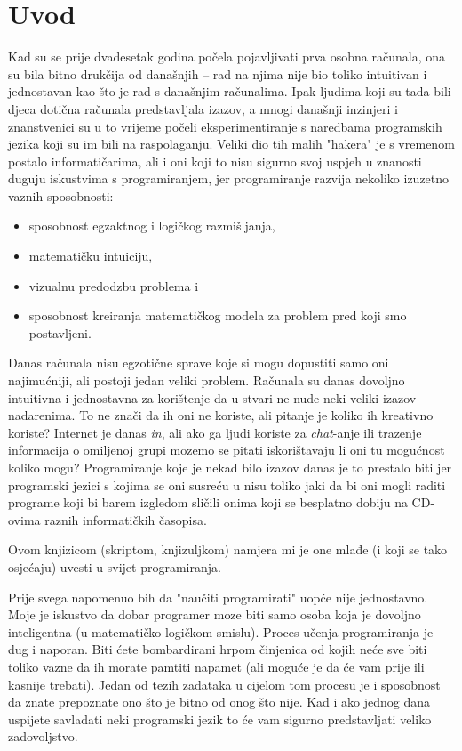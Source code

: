\chapter*{Uvod}

Kad su se prije dvadesetak godina počela pojavljivati prva osobna računala, ona
su bila bitno drukčija od današnjih -- rad na njima nije bio toliko intuitivan i
jednostavan kao što je rad s današnjim računalima. Ipak ljudima koji su tada
bili djeca dotična računala predstavljala izazov, a mnogi današnji
inzinjeri i znanstvenici su u to vrijeme počeli eksperimentiranje s naredbama
programskih jezika koji su im bili na raspolaganju. Veliki dio tih malih "hakera" je s
vremenom postalo informatičarima, ali i oni koji to nisu sigurno svoj uspjeh u
znanosti duguju iskustvima s programiranjem, jer programiranje razvija nekoliko
izuzetno vaznih sposobnosti:

\begin{itemize}
   \item sposobnost egzaktnog i logičkog razmišljanja,
   \item matematičku intuiciju,
   \item vizualnu predodzbu problema i
   \item sposobnost kreiranja matematičkog modela za problem pred koji smo
   posta\-vlje\-ni.
\end{itemize}

Danas računala nisu egzotične sprave koje si mogu dopustiti samo oni
najimućniji, ali postoji jedan veliki problem.
Računala su danas dovoljno intuitivna i jednostavna za korištenje da u stvari ne
nude neki veliki izazov nadarenima. To ne znači da ih oni ne koriste, ali
pitanje je koliko ih kreativno koriste? Internet je danas \emph{in}, ali ako ga ljudi
koriste za \emph{chat}-anje ili trazenje informacija o omiljenoj grupi mozemo se
pitati iskorištavaju li oni tu mogu\'cnost koliko mogu? Programiranje koje je nekad
bilo izazov danas je to prestalo biti jer programski jezici s kojima se oni susreću
u nisu toliko jaki da bi oni mogli raditi programe koji bi barem izgledom sličili
onima koji se besplatno dobiju na CD-ovima raznih informatičkih časopisa.

Ovom knjizicom (skriptom, knjizuljkom) namjera mi je one mlađe (i koji se
tako osjećaju)
uvesti u svijet programiranja. 

Prije svega napomenuo bih da "naučiti programirati" uopće nije jednostavno.
Moje je iskustvo da dobar programer moze biti samo osoba koja je dovoljno
inteligentna (u matematičko-logičkom smislu). Proces učenja programiranja
je dug i naporan. Biti ćete bombardirani hrpom činjenica od kojih neće sve
biti toliko vazne da ih morate pamtiti napamet (ali moguće je da će vam
prije ili kasnije trebati). Jedan od tezih zadataka u cijelom tom procesu je i
sposobnost da znate prepoznate ono što je bitno od onog što nije.
Kad i ako jednog dana uspijete savladati neki programski jezik to će vam
sigurno predstavljati veliko zadovoljstvo.

